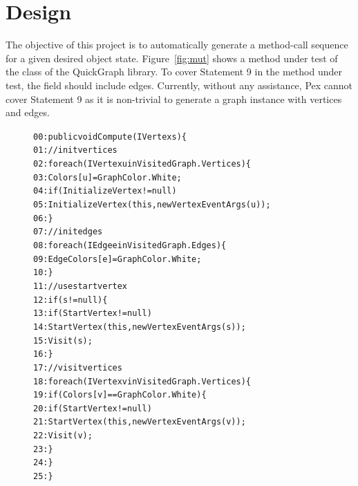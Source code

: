 \section{Design}
\label{design}

The objective of this project is to automatically generate a method-call sequence for a given desired object state. Figure~\ref{fig:mut} shows a method under test of the class  of the QuickGraph library. To cover Statement 9 in the method under test, the field  should include edges. Currently, without any assistance, Pex cannot cover Statement 9 as it is non-trivial to generate a graph instance with vertices and edges.

\begin{figure}[t]
\begin{CodeOut}
\begin{alltt}
00:public void Compute(IVertex s) \{
01:\hspace*{0.2in}// init vertices
02:\hspace*{0.2in}foreach(IVertex u in VisitedGraph.Vertices) \{
03:\hspace*{0.3in}Colors[u]=GraphColor.White;
04:\hspace*{0.3in}if (InitializeVertex != null)
05:\hspace*{0.4in}InitializeVertex(this, new VertexEventArgs(u));
06:\hspace*{0.2in}\}
07:\hspace*{0.2in}//init edges
08:\hspace*{0.2in}foreach(IEdge e in VisitedGraph.Edges) \{
09:\hspace*{0.3in}EdgeColors[e]=GraphColor.White;
10:\hspace*{0.2in}\}
11:\hspace*{0.2in}// use start vertex
12:\hspace*{0.2in}if (s != null) \{
13:\hspace*{0.3in}if (StartVertex != null)
14:\hspace*{0.4in}StartVertex(this,new VertexEventArgs(s));
15:\hspace*{0.3in}Visit(s);
16:\hspace*{0.2in}\}
17:\hspace*{0.2in}// visit vertices
18:\hspace*{0.2in}foreach(IVertex v in VisitedGraph.Vertices) \{
19:\hspace*{0.3in}if (Colors[v] == GraphColor.White) \{
20:\hspace*{0.4in}if (StartVertex != null)
21:\hspace*{0.5in}StartVertex(this,new VertexEventArgs(v));
22:\hspace*{0.3in}Visit(v);
23:\hspace*{0.2in}\}
24:\hspace*{0.2in}\}
25:\}
\end{alltt}
\end{CodeOut}
\end{figure}

